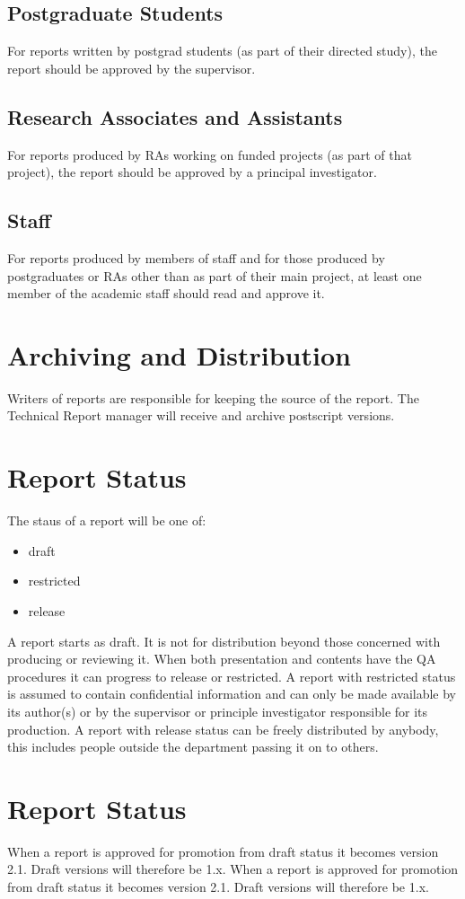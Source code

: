 \documentclass[a4paper, 12pt]{article}
\begin{document}
\begin{multicols}{2}
\subsection{Postgraduate Students}
For reports written by postgrad students (as part of
their directed study), the report should be approved by
the supervisor.
\subsection{Research Associates and Assistants}
For reports produced by RAs working on funded
projects (as part of that project), the report should be
approved by a principal investigator.
\subsection{Staff}
For reports produced by members of staff and for those
produced by postgraduates or RAs other than as part of
their main project, at least one member of the academic
staff should read and approve it.
\section{Archiving and Distribution}
\label{sec:arch}
Writers of reports are responsible for keeping the source
of the report. The Technical Report manager will receive and archive postscript versions.
\section{Report Status}
The staus of a report will be one of:
\begin{itemize}
\item draft
\item restricted
\item release
\end{itemize}
A report starts as draft. It is not for distribution
beyond those concerned with producing or reviewing
it. When both presentation and contents have the QA
procedures it can progress to release or restricted. A
report with restricted status is assumed to contain confidential information and can only be made available
by its author(s) or by the supervisor or principle investigator responsible for its production. A report with
release status can be freely distributed by anybody, this
includes people outside the department passing it on to
others.
\section{Report Status}
\label{sec:report}
When a report is approved for promotion from draft
status it becomes version 2.1. Draft versions will therefore be 1.x.
When a report is approved for promotion from draft
status it becomes version 2.1. Draft versions will therefore be 1.x.


\end{multicols}
\end{document}
